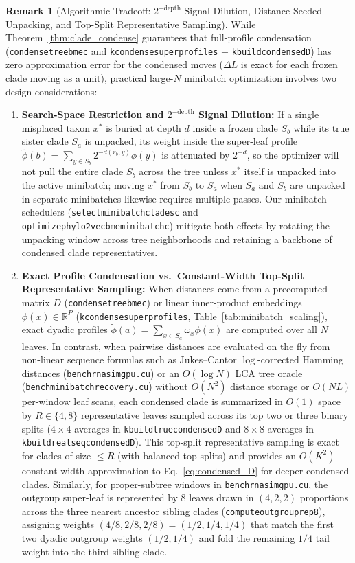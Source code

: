 \documentclass[11pt,a4paper]{article}
\makeatletter
\DeclareRobustCommand{\_}{\ifmmode\nfss@text{\textunderscore}\else\textunderscore\allowbreak\fi}
\theoremstyle{definition}
\newtheorem{remark}[theorem]{Remark}
\makeatother
\begin{document}
\begin{remark}[Algorithmic Tradeoff: $2^{-\text{depth}}$ Signal Dilution, Distance-Seeded Unpacking, and Top-Split Representative Sampling]
\label{rem:minibatch_tradeoffs}
While Theorem~\ref{thm:clade_condense} guarantees that full-profile condensation (\texttt{condense\_tree\_bme\_c} and \texttt{k\_condense\_super\_profiles} $+$ \texttt{k\_build\_condensed\_D}) has zero approximation error for the condensed moves ($\Delta L$ is exact for each frozen clade moving as a unit), practical large-$N$ minibatch optimization involves two design considerations:
\begin{enumerate}
    \item \textbf{Search-Space Restriction and $2^{-\text{depth}}$ Signal Dilution:} If a single misplaced taxon $x^*$ is buried at depth $d$ inside a frozen clade $S_b$ while its true sister clade $S_a$ is unpacked, its weight inside the super-leaf profile $\widetilde{\phi}(b) = \sum_{y \in S_b} 2^{-d(r_b, y)} \phi(y)$ is attenuated by $2^{-d}$, so the optimizer will not pull the entire clade $S_b$ across the tree unless $x^*$ itself is unpacked into the active minibatch; moving $x^*$ from $S_b$ to $S_a$ when $S_a$ and $S_b$ are unpacked in separate minibatches likewise requires multiple passes. Our minibatch schedulers (\texttt{select\_minibatch\_clades\_c} and \texttt{optimize\_phylo2vec\_bme\_minibatch\_c}) mitigate both effects by rotating the unpacking window across tree neighborhoods and retaining a backbone of condensed clade representatives.
    \item \textbf{Exact Profile Condensation vs.\ Constant-Width Top-Split Representative Sampling:} When distances come from a precomputed matrix $D$ (\texttt{condense\_tree\_bme\_c}) or linear inner-product embeddings $\phi(x) \in \mathbb{R}^P$ (\texttt{k\_condense\_super\_profiles}, Table~\ref{tab:minibatch_scaling}), exact dyadic profiles $\widetilde{\phi}(a) = \sum_{x \in S_a} \omega_x \phi(x)$ are computed over all $N$ leaves. In contrast, when pairwise distances are evaluated on the fly from non-linear sequence formulas such as Jukes--Cantor $\log$-corrected Hamming distances (\texttt{bench\_rnasim\_gpu.cu}) or an $O(\log N)$ LCA tree oracle (\texttt{bench\_minibatch\_recovery.cu}) without $O(N^2)$ distance storage or $O(N L)$ per-window leaf scans, each condensed clade is summarized in $O(1)$ space by $R \in \{4, 8\}$ representative leaves sampled across its top two or three binary splits ($4 \times 4$ averages in \texttt{k\_build\_true\_condensed\_D} and $8 \times 8$ averages in \texttt{k\_build\_real\_seq\_condensed\_D}). This top-split representative sampling is exact for clades of size $\le R$ (with balanced top splits) and provides an $O(K^2)$ constant-width approximation to Eq.~\eqref{eq:condensed_D} for deeper condensed clades. Similarly, for proper-subtree windows in \texttt{bench\_rnasim\_gpu.cu}, the outgroup super-leaf is represented by 8 leaves drawn in $(4, 2, 2)$ proportions across the three nearest ancestor sibling clades (\texttt{compute\_outgroup\_rep8}), assigning weights $(4/8, 2/8, 2/8) = (1/2, 1/4, 1/4)$ that match the first two dyadic outgroup weights $(1/2, 1/4)$ and fold the remaining $1/4$ tail weight into the third sibling clade.

\end{enumerate}
\end{remark}
\end{document}
